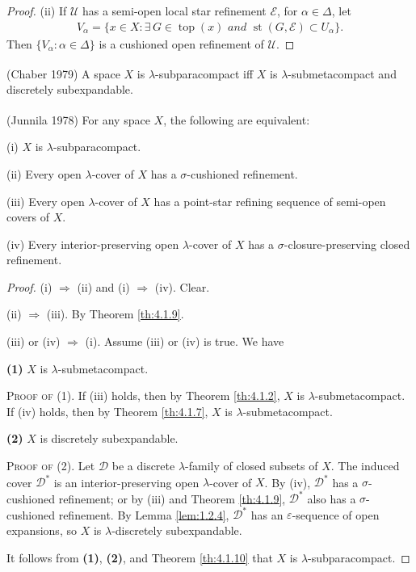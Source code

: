 \documentclass[main.tex]{subfiles}
\begin{document}
\begin{proof}
(ii) If $\mathscr{U}$ has a semi-open local star refinement $\mathscr{E}$, for $\alpha \in \Delta$, 
let 
\begin{gather*}
V_\alpha = \{x\in X: \exists \, G\in\operatorname{top}(x) \textit{ and } 
\operatorname{st}(G, \mathscr{E}) \subset U_\alpha\}.
\end{gather*}
Then $\{V_\alpha: \alpha \in \Delta\}$ is a cushioned open refinement of $\mathscr{U}$.
\end{proof} 


{\theorem{} \label{th:4.1.10}
\textup{(\hstretch{1.8}{[}Chaber 1979\hstretch{1.8}{]}\textsuperscript{\cite{Chaber}})} 
A space $X$ is $\lambda$-subparacompact iff $X$ is 
$\lambda$-submetacompact and discretely subexpandable. \hfill\qedsymbol
}

{\theorem{} \label{th:4.1.11}
\textup{(\hstretch{1.8}{[}Junnila 1978\hstretch{1.8}{]}\textsuperscript{\cite{Junnila1978}})} 
For any space $X$, the following are equivalent:

\textup{(i)}  $X$ is $\lambda$-subparacompact.

\textup{(ii)}  Every open $\lambda$-cover of $X$ has a $\sigma$-cushioned refinement.

\textup{(iii)}  Every open $\lambda$-cover of $X$ has a point-star refining sequence of 
semi-open covers of $X$.

\textup{(iv)}  Every interior-preserving open $\lambda$-cover of $X$ has a 
$\sigma$-closure-preserving closed refinement.
}

\begin{proof}
(i)  $\Rightarrow$  (ii) and (i)  $\Rightarrow$  (iv). Clear. 

(ii) $\Rightarrow$ (iii). By Theorem \ref{th:4.1.9}.

(iii) or (iv) $\Rightarrow$ (i). Assume (iii)  or (iv) is true. We have

\textbf{(1)}  $X$ is $\lambda$-submetacompact. 

\noindent\textsc{Proof of (1)}. If (iii) holds, then by Theorem \ref{th:4.1.2}, $X$ is $\lambda$-submetacompact. 
If (iv) holds, then by Theorem \ref{th:4.1.7}, $X$ is $\lambda$-submetacompact.

\textbf{(2)} $X$ is discretely subexpandable. 

\noindent\textsc{Proof of (2)}. Let $\mathscr{D}$ be a discrete $\lambda$-family of closed subsets of $X$. 
The induced cover $\mathscr{D}^*$ is an interior-preserving open $\lambda$-cover of $X$. 
By (iv), $\mathscr{D}^*$ has a $\sigma$-cushioned refinement; or by (iii) and Theorem \ref{th:4.1.9},
 $\mathscr{D}^*$ also has a $\sigma$-cushioned refinement. 
 By Lemma \ref{lem:1.2.4}, $\mathscr{D}^*$ has an $\varepsilon$-sequence of open expansions, 
 so $X$ is $\lambda$-discretely subexpandable.

It follows from \textbf{(1)}, \textbf{(2)}, and Theorem \ref{th:4.1.10} that 
$X$ is $\lambda$-subparacompact.
\end{proof} 
\end{document}

